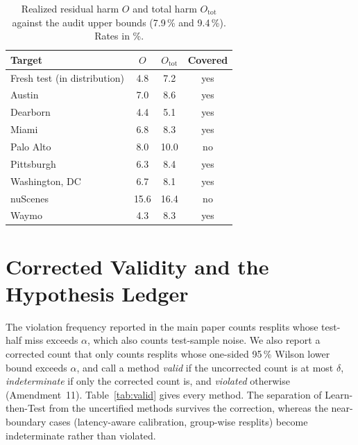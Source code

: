 \documentclass[lettersize,journal]{IEEEtran}
\begin{document}
\begin{table}[h]
\caption{Realized residual harm $O$ and total harm $O_{\mathrm{tot}}$
against the audit upper bounds (7.9\,\% and 9.4\,\%). Rates in \%.}
\label{tab:audit}
\centering
\scriptsize\setlength{\tabcolsep}{2.5pt}
\begin{tabular}{lccc}
\toprule
Target & $O$ & $O_{\mathrm{tot}}$ & Covered \\
\midrule
Fresh test (in distribution) & 4.8 & 7.2 & yes \\
Austin & 7.0 & 8.6 & yes \\
Dearborn & 4.4 & 5.1 & yes \\
Miami & 6.8 & 8.3 & yes \\
Palo Alto & 8.0 & 10.0 & no \\
Pittsburgh & 6.3 & 8.4 & yes \\
Washington, DC & 6.7 & 8.1 & yes \\
nuScenes & 15.6 & 16.4 & no \\
Waymo & 4.3 & 8.3 & yes \\
\bottomrule
\end{tabular}
\end{table}

\section{Corrected Validity and the Hypothesis Ledger}
\label{sec:s-ledger}
The violation frequency reported in the main paper counts resplits whose
test-half miss exceeds $\alpha$, which also counts test-sample noise. We
also report a corrected count that only counts resplits whose one-sided
95\,\% Wilson lower bound exceeds $\alpha$, and call a method \emph{valid} if
the uncorrected count is at most $\delta$, \emph{indeterminate} if only the
corrected count is, and \emph{violated} otherwise (Amendment~11).
Table~\ref{tab:valid} gives every method. The separation of Learn-then-Test
from the uncertified methods survives the correction, whereas the
near-boundary cases (latency-aware calibration, group-wise resplits)
become indeterminate rather than violated.
\end{document}
